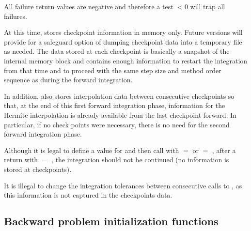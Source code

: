 {
  All failure return values are negative and therefore a test $< 0$
  will trap all  failures.

  At this time,  stores checkpoint information in memory
  only. Future versions will provide for a safeguard option of dumping checkpoint
  data into a temporary file as needed. The data stored at each checkpoint is basically
  a snapshot of the {\cvodes} internal memory block and contains enough information
  to restart the integration from that time and to proceed with the same step size and
  method order sequence as during the forward integration.
  
  In addition,  also stores interpolation data between consecutive checkpoints
  so that, at the end of this first forward integration phase, information for the Hermite 
  interpolation is already available from the last checkpoint forward. In particular,
  if no check points were necessary, there is no need for the second forward integration phase.

  {\warn} Although it is legal to define a value for  and then call 
  with  $=$  or  $=$ , 
  after a return with  $=$ , the integration should not be 
  continued (no  information is stored at checkpoints).

  {\warn} It is illegal to change the integration tolerances between consecutive calls
  to , as this information is not captured in the checkpoints data.
}  


\subsection{Backward problem initialization functions}\label{sss:cvodemallocb}

